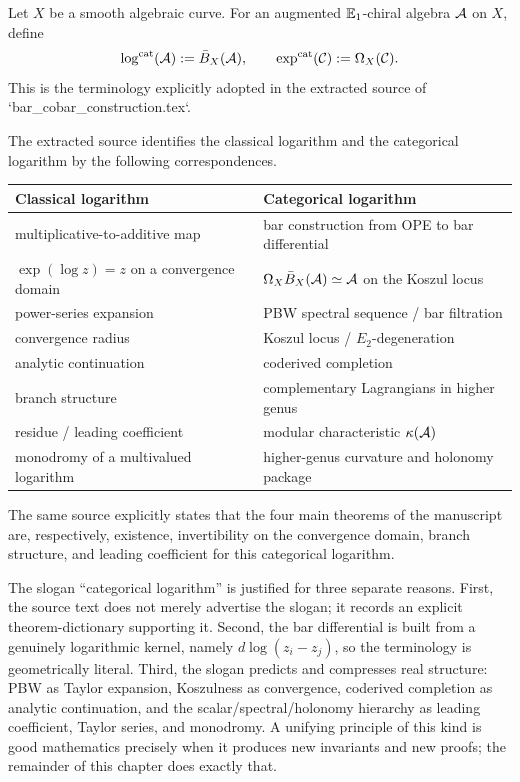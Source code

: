\begin{definition}
\label{def:categorical-log-exp-note}
Let $X$ be a smooth algebraic curve.  For an augmented $\mathbb{E}_1$-chiral algebra
$\mathcal{A}$ on $X$, define
\[
\log^{\mathrm{cat}}(\mathcal{A}):=\bar B_X(\mathcal{A}),
\qquad
\exp^{\mathrm{cat}}(\mathcal{C}):=\Omega_X(\mathcal{C}).
\]
This is the terminology explicitly adopted in the extracted source of
`bar\_cobar\_construction.tex`.
\end{definition}

\begin{summary}
\label{sum:logarithmic-dictionary}
The extracted source identifies the classical logarithm and the categorical
logarithm by the following correspondences.
\begin{center}
\small
\renewcommand{\arraystretch}{1.25}
\begin{tabular}{p{5.5cm}p{5.8cm}}
\textbf{Classical logarithm} & \textbf{Categorical logarithm} \\
\hline
multiplicative-to-additive map & bar construction from OPE to bar differential \\
$\exp(\log z)=z$ on a convergence domain & $\Omega_X\bar B_X(\mathcal{A})\simeq \mathcal{A}$ on the Koszul locus \\
power-series expansion & PBW spectral sequence / bar filtration \\
convergence radius & Koszul locus / $E_2$-degeneration \\
analytic continuation & coderived completion \\
branch structure & complementary Lagrangians in higher genus \\
residue / leading coefficient & modular characteristic $\kappa(\mathcal{A})$ \\
monodromy of a multivalued logarithm & higher-genus curvature and holonomy package
\end{tabular}
\end{center}
The same source explicitly states that the four main theorems of the manuscript
are, respectively, existence, invertibility on the convergence domain, branch
structure, and leading coefficient for this categorical logarithm.
\end{summary}

\begin{remark}
\label{rem:why-not-branding}
The slogan ``categorical logarithm'' is justified for three separate reasons.
First, the source text does not merely advertise the slogan; it records an
explicit theorem-dictionary supporting it.  Second, the bar differential is
built from a genuinely logarithmic kernel, namely $d\log(z_i-z_j)$, so the
terminology is geometrically literal.  Third, the slogan predicts and compresses
real structure: PBW as Taylor expansion, Koszulness as convergence, coderived
completion as analytic continuation, and the scalar/spectral/holonomy hierarchy
as leading coefficient, Taylor series, and monodromy.  A unifying principle of
this kind is good mathematics precisely when it produces new invariants and new
proofs; the remainder of this chapter does exactly that.
\end{remark}


